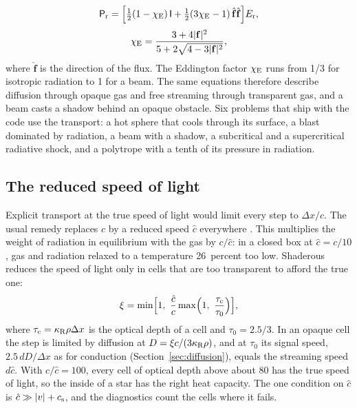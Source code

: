 \documentclass[twocolumn]{aastex701}
\begin{document}
\begin{equation*}
\mathsf{P}_{\rm r} = \Bigl[\tfrac{1}{2}(1 - \chi_{\rm E})\,\mathsf{I} + \tfrac{1}{2}(3\chi_{\rm E} - 1)\,\hat{\mathbf{f}}\hat{\mathbf{f}}\Bigr]E_{\rm r},
\end{equation*}
\begin{equation*}
\chi_{\rm E} = \frac{3 + 4|\mathbf{f}|^2}{5 + 2\sqrt{4 - 3|\mathbf{f}|^2}},
\end{equation*}
where $\hat{\mathbf{f}}$ is the direction of the flux. The Eddington factor $\chi_{\rm E}$ runs from 1/3 for isotropic radiation to 1 for a beam. The same equations therefore describe diffusion through opaque gas and free streaming through transparent gas, and a beam casts a shadow behind an opaque obstacle. Six problems that ship with the code use the transport: a hot sphere that cools through its surface, a blast dominated by radiation, a beam with a shadow, a subcritical and a supercritical radiative shock, and a polytrope with a tenth of its pressure in radiation.

\subsection{The reduced speed of light}
\label{sec:rsla}

Explicit transport at the true speed of light would limit every step to $\Delta x/c$. The usual remedy replaces $c$ by a reduced speed $\hat{c}$ everywhere \citep{Skinner2013, Wibking2022}. This multiplies the weight of radiation in equilibrium with the gas by $c/\hat{c}$: in a closed box at $\hat{c} = c/10$, gas and radiation relaxed to a temperature 26~percent too low. Shaderous reduces the speed of light only in cells that are too transparent to afford the true one:
\begin{equation*}
\xi = \min\Bigl[1,\ \frac{\hat{c}}{c}\max\Bigl(1,\ \frac{\tau_{\rm c}}{\tau_0}\Bigr)\Bigr],
\end{equation*}
where $\tau_{\rm c} = \kappa_{\rm R}\rho\Delta x$ is the optical depth of a cell and $\tau_0 = 2.5/3$. In an opaque cell the step is limited by diffusion at $D = \xi c/(3\kappa_{\rm R}\rho)$, and at $\tau_0$ its signal speed, $2.5\,dD/\Delta x$ as for conduction (Section~\ref{sec:diffusion}), equals the streaming speed $d\hat{c}$. With $c/\hat{c} = 100$, every cell of optical depth above about 80 has the true speed of light, so the inside of a star has the right heat capacity. The one condition on $\hat{c}$ is $\hat{c} \gg |v| + c_{\rm s}$, and the diagnostics count the cells where it fails.
\end{document}
